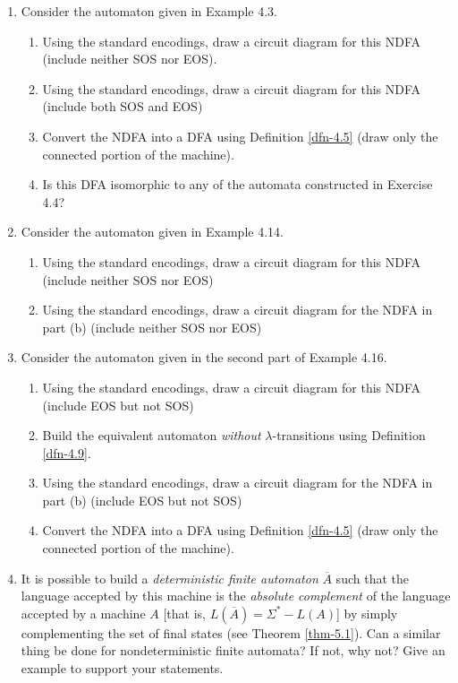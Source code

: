 \begin{enumerate}[{4.}1.]
\item Consider the automaton given in Example 4.3.
\begin{enumerate}
\item Using the standard encodings, draw a circuit diagram for this NDFA
(include neither \<SOS\> nor \<EOS\>).
\item Using the standard encodings, draw a circuit diagram for this NDFA
(include both \<SOS\> and \<EOS\>)
\item Convert the NDFA into a DFA using Definition \ref{dfn-4.5} (draw only the connected
portion of the machine).
\item Is this DFA isomorphic to any of the automata constructed in Exercise 4.4?
\end{enumerate}

\item Consider the automaton given in Example 4.14.
\begin{enumerate}
\item Using the standard encodings, draw a circuit diagram for this NDFA
(include neither \<SOS\> nor \<EOS\>)
\item Using the standard encodings, draw a circuit diagram for the NDFA in part
(b) (include neither \<SOS\> nor \<EOS\>)
\end{enumerate}

\item Consider the automaton given in the second part of Example 4.16.
\begin{enumerate}
\item Using the standard encodings, draw a circuit diagram for this NDFA
(include \<EOS\> but not \<SOS\>)
\item Build the equivalent automaton \emph{without} $\lambda$-transitions using
Definition \ref{dfn-4.9}.
\item Using the standard encodings, draw a circuit diagram for the NDFA in part
(b) (include \<EOS\> but not \<SOS\>)
\item Convert the NDFA into a DFA using Definition \ref{dfn-4.5} (draw only the connected
portion of the machine).
\end{enumerate}

\item It is possible to build a \emph{deterministic finite automaton}
$\overline{A}$ such that the language accepted by this machine is the
\emph{absolute complement} of the language accepted by a machine $A$ [that is,
$L(\overline{A})=\Sigma^* - L(A)$] by simply complementing the set of final
states (see Theorem \ref{thm-5.1}). Can a similar thing be done for nondeterministic
finite automata? If not, why not? Give an example to support your statements.


\end{enumerate}

